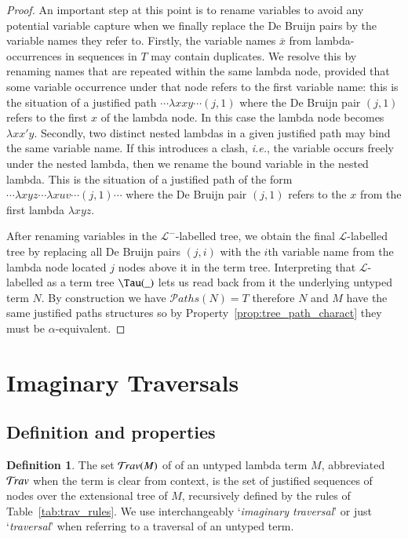 \documentclass{elsarticle}
\makeatletter
\theoremstyle{plain}
\theoremstyle{definition}
\newtheorem{definition}{Definition}[section]
\newcommand{\travulc}{\travset}
\newcommand{\ctree}{\Tau} %
\newcommand\pathset{{\mathcal{P}aths}} %
\renewcommand\ie{{\it i.e.\@\xspace}}
\makeatother
\begin{document}
\begin{proof}
An important step at this point is to rename variables to avoid any potential variable capture when we finally replace the De Bruijn pairs by the variable names they refer to.
%
Firstly, the variable names $\overline{x}$ from lambda-occurrences in sequences in $T$ may contain duplicates. We resolve this by renaming names that are repeated within the same lambda node, provided that some variable occurrence under that node refers to the first variable name: this is the situation of a justified path  $\cdots \lambda x x y \cdots (j,1)$ where the De Bruijn pair $(j,1)$ refers to the first $x$ of the lambda node. In this case the lambda node becomes $\lambda x x' y$.
%
Secondly, two distinct nested lambdas in a given justified path may bind the same variable name. If this introduces a clash, \ie, the variable occurs freely under the nested lambda, then we rename the bound variable in the nested lambda. This is the situation of a justified path of the form $\cdots \lambda{xyz} \cdots \lambda {xuv} \cdots (j,1) \cdots$
 where the De Bruijn pair $(j,1)$ refers to the $x$ from the first lambda $\lambda{x y z}$.

After renaming variables in the $\mathcal{L^-}$-labelled tree, we obtain the final $\mathcal{L}$-labelled tree by replacing all De Bruijn pairs $(j,i)$ with the $i$th variable name from the lambda node located $j$ nodes above it in the term tree.
%
Interpreting that $\mathcal{L}$-labelled as a term tree $\ctree(\_ )$ lets us read back from it the underlying untyped term $N$.
%
By construction we have $\pathset(N) = T$ therefore
$N$ and $M$ have the same justified paths structures so by
Property~\ref{prop:tree_path_charact} they must be $\alpha$-equivalent.
\end{proof}


\section{Imaginary Traversals}
\label{sec:imaginary_traversals}
\subsection{Definition and properties}

\begin{definition}
The set $\travulc(M)$ of  of an untyped lambda term $M$, abbreviated $\travulc$ when the term is clear from context, is the set of justified sequences of nodes over the extensional tree of $M$, recursively defined by the rules of Table~\ref{tab:trav_rules}.
%
We use interchangeably `\emph{imaginary traversal}' or just `\emph{traversal}' when referring to a traversal of an untyped term.
\end{definition}
\end{document}
